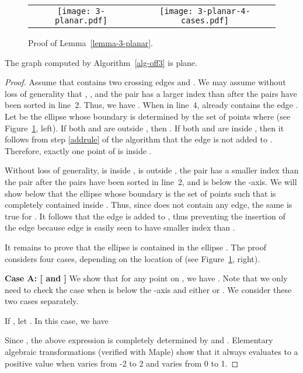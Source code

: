 \documentclass[pdftex,leqno,fleqn,12pts]{llncs}
\begin{document}
\begin{figure}
  \centering
\begin{tabular}{cc}
\texttt{[image: 3-planar.pdf]} &
\texttt{[image: 3-planar-4-cases.pdf]}
\end{tabular}
\caption{Proof of Lemma~\ref{lemma-3-planar}.}
\label{fig-3-planar}
\end{figure}


\begin{lemma}  \label{lemma-3-planar} 
The graph  computed by Algorithm~\ref{alg-off3} is plane.
\end{lemma}
\begin{proof}
Assume that  contains two crossing edges  and . We may 
assume without loss of generality that , , and the
pair  has a larger index than  after the pairs have been 
sorted in line~2. Thus, we have . When
 in line~4,  already contains the edge .
Let  be the ellipse whose boundary is determined by the set of points  where  (see
Figure~\ref{fig-3-planar}, left). If both  and  are outside ,
then . If both  and  are inside , then it 
follows from step \ref{addrule} of the algorithm that the edge  is not added to . 
Therefore, exactly one point of  is inside .

Without loss of generality,  is inside ,  is outside , 
the pair  has a smaller index than the pair  after 
the pairs have been sorted in line~2, and  is below the -axis. 
We will show below that the ellipse  whose boundary is the set of 
points  such that  is completely contained inside 
. Thus, since  does not contain any edge, the same is true for 
. It follows that the edge  is added to , thus preventing 
the insertion of the edge  because edge  is easily seen
to have smaller index than .

It remains to prove that the ellipse  is contained in the ellipse 
. The proof considers four cases, depending on the location of  
(see Figure~\ref{fig-3-planar}, right).

\vspace{0.5em} 

\noindent 
\textbf{Case A: [ and ]} We show that for any point  on , we have 
. Note that we only need to check the case when 
 is below the -axis and either  or . 
We consider these two cases separately.

If , let . In this case, we have 
 
Since , the above expression is completely 
determined by  and . Elementary algebraic transformations (verified with Maple) show that it always
evaluates to a positive value when  varies from -2 to 2 and  
varies from 0 to 1.



\end{proof}
\end{document}
